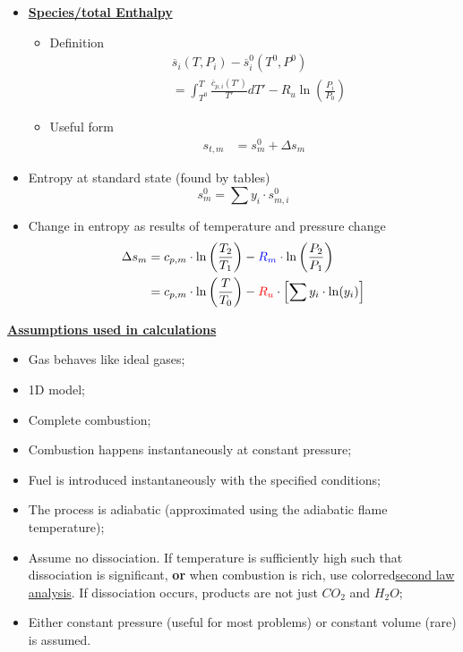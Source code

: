 \begin{itemize}
    \item {\color{blue}\textbf{\ul{Species/total Enthalpy}}}
    \begin{itemize}
        \item Definition
        \begin{align*}
            &\overline{s}_i (T, P_i) - \overline{s}^{0}_{i} (T^0 ,P^0 ) \\
            &= \int_{T^0}^{T} \frac{\overline{c}_{p,i}(T')}{T'} dT' - R_u \ln(\frac{P_i}{P_0})
        \end{align*}
        \item Useful form
        \begin{align*}
            s_{t,m} &= s_{m}^{0} + \Delta s_m
        \end{align*}
    \end{itemize}
    \item Entropy at standard state (found by tables)
    \begin{equation*}
        s_{m}^{0} = \sum y_i \cdot s_{m,i}^{0}
    \end{equation*}
    \item Change in entropy as results of temperature and pressure change
    \begin{align*}
        \Delta s_m &= c_{p,m} \cdot \ln\left(\frac{T_2}{T_1}\right) - {\color{blue}R_m} \cdot \ln\left(\frac{P_2}{P_1}\right)\\
        &= c_{p,m} \cdot \ln\left(\frac{T}{T_0}\right) - {\color{red}R_u} \cdot  \left[\sum y_i \cdot \ln(y_i)\right]
    \end{align*}
\end{itemize}

{\Large \textbf{{\color{blue}\underline{Assumptions used in calculations}}}}

\begin{itemize}
    \item Gas behaves like ideal gases;
    \item 1D model;
    \item Complete combustion;
    \item Combustion happens instantaneously at constant pressure;
    \item Fuel is introduced instantaneously with the specified conditions;
    \item The process is adiabatic (approximated using the adiabatic flame temperature);
    \item Assume no dissociation. If temperature is sufficiently high such that dissociation is significant, \textbf{or} when combustion is rich, use {color{red}\ul{second law analysis}}. If dissociation occurs, products are not just $CO_2$ and $H_2 O$;
    \item Either constant pressure (useful for most problems) or constant volume (rare) is assumed.
\end{itemize}

